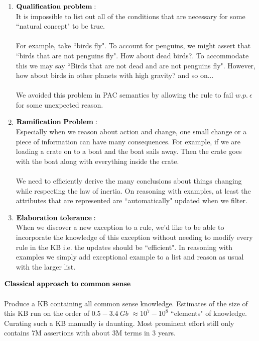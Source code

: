 \documentclass[10pt]{article}
\begin{document}
\begin{enumerate}
\item $\bf{Qualification\ problem:}$\\
It is impossible to list out all of the conditions that are necessary for some ``natural concept" to be true.\\
\\
For example, take ``birds fly". To account for penguins, we might assert that ``birds that are not penguins fly". How about dead birds?. To accommodate this we may say ``Birds that are not dead and are not penguins fly". However, how about birds in other planets with high gravity? and so on...\\
\\
We avoided this problem in PAC semantics by allowing the rule to fail $w.p.\ \epsilon$ for some unexpected reason.\\
\item $\bf{Ramification\ Problem:}$\\
Especially when we reason about action and change, one small change or a piece of information can have many consequences. For example, if we are loading a crate on to a boat and the boat sails away. Then the crate goes with the boat along with everything inside the crate. \\
\\
We need to efficiently derive the many conclusions about things changing while respecting the law of inertia. On reasoning with examples, at least the attributes that are represented are ``automatically" updated when we filter.\\
\item $\bf{Elaboration\ tolerance:}$\\
When we discover a new exception to a rule, we'd like to be able to incorporate the knowledge of this exception without needing to modify every rule in the KB i.e. the updates should be ``efficient". In reasoning with examples we simply add exceptional example to a list and reason as usual with the larger list. \\
\end{enumerate}
$\bf{Classical\ approach\ to\ common\ sense}$\\
\\
Produce a KB containing all common sense knowledge. Estimates of the size of this KB run on the order of $0.5- 3.4\ Gb$ $\approx 10^7-10^8$  ``elements" of knowledge. Curating such a KB manually is daunting. Most prominent effort still only contains 7M assertions with about 3M terms in 3 years.\\
\end{document}
